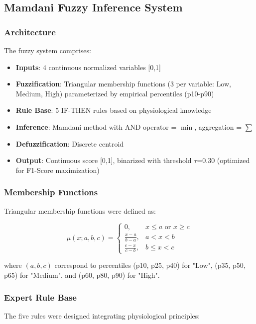 \documentclass[journal,twoside,web]{ieeecolor}
\begin{document}
\subsection{Mamdani Fuzzy Inference System}

\subsubsection{Architecture}
The fuzzy system comprises:
\begin{itemize}
\item \textbf{Inputs}: 4 continuous normalized variables [0,1]
\item \textbf{Fuzzification}: Triangular membership functions (3 per variable: Low, Medium, High) parameterized by empirical percentiles (p10-p90)
\item \textbf{Rule Base}: 5 IF-THEN rules based on physiological knowledge
\item \textbf{Inference}: Mamdani method with AND operator = $\min$, aggregation = $\sum$
\item \textbf{Defuzzification}: Discrete centroid
\item \textbf{Output}: Continuous score [0,1], binarized with threshold $\tau$=0.30 (optimized for F1-Score maximization)
\end{itemize}

\subsubsection{Membership Functions}
Triangular membership functions were defined as:

\begin{equation}
\mu(x; a, b, c) = 
\begin{cases}
0, & x \leq a \text{ or } x \geq c \\
\frac{x-a}{b-a}, & a < x < b \\
\frac{c-x}{c-b}, & b \leq x < c
\end{cases}
\end{equation}

where $(a, b, c)$ correspond to percentiles (p10, p25, p40) for "Low", (p35, p50, p65) for "Medium", and (p60, p80, p90) for "High".

\subsubsection{Expert Rule Base}
The five rules were designed integrating physiological principles:
\end{document}
